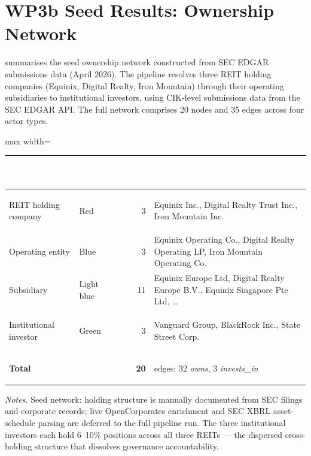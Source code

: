 \section{WP3b Seed Results: Ownership Network}
\label{app:wp3bresults}

 summarises the seed ownership network constructed from SEC EDGAR
submissions data (April 2026). The pipeline resolves three REIT holding companies
(Equinix, Digital Realty, Iron Mountain) through their operating subsidiaries to
institutional investors, using CIK-level submissions data from the SEC EDGAR API.
The full network comprises 20 nodes and 35 edges across four actor types.

\begin{fullwidth}
\small
{}
\setlength{\tabcolsep}{5pt}
\renewcommand{\arraystretch}{1.35}
\begin{adjustbox}{max width=\linewidth}
\begin{tabular}{>{\bfseries\raggedright}p{3.0cm}>{\raggedright}p{1.6cm}r>{\raggedright\arraybackslash}p{7.0cm}}
\toprule
\rowcolor{dcblue}
\textcolor{white}{\textbf{Actor type}} &
\textcolor{white}{\textbf{Colour}} &
\textcolor{white}{\textbf{Count}} &
\textcolor{white}{\textbf{Examples}} \\
\midrule
REIT holding company & Red & 3 & Equinix Inc., Digital Realty Trust Inc., Iron Mountain Inc. \\
\addlinespace[2pt]
\rowcolor{dcgray}
Operating entity & Blue & 3 & Equinix Operating Co., Digital Realty Operating LP, Iron Mountain Operating Co. \\
\addlinespace[2pt]
Subsidiary & Light blue & 11 & Equinix Europe Ltd, Digital Realty Europe B.V., Equinix Singapore Pte Ltd, \ldots \\
\addlinespace[2pt]
\rowcolor{dcgray}
Institutional investor & Green & 3 & Vanguard Group, BlackRock Inc., State Street Corp. \\
\midrule
\textbf{Total} & & \textbf{20} & 35 edges: 32 \textit{owns}, 3 \textit{invests\_in} \\
\bottomrule
\end{tabular}
\end{adjustbox}
\vspace{0.4em}
\begin{flushleft}
\footnotesize\textit{Notes.} Seed network: holding structure is manually documented
from SEC filings and corporate records; live OpenCorporates enrichment and SEC XBRL
asset-schedule parsing are deferred to the full pipeline run. The three institutional
investors each hold 6--10\% positions across all three REITs --- the dispersed
cross-holding structure that dissolves governance accountability.
\end{flushleft}
\end{fullwidth}


